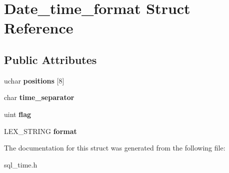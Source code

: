 \hypertarget{structDate__time__format}{}\section{Date\+\_\+time\+\_\+format Struct Reference}
\label{structDate__time__format}
\subsection*{Public Attributes}
\begin{DoxyCompactItemize}
\item 
\mbox{\label{structDate__time__format_a4a5f661901c001ffa183473fc2e618c1}} 
uchar {\bfseries positions} \mbox{[}8\mbox{]}
\item 
\mbox{\label{structDate__time__format_ad522046d6da80328315d6aa11ae57172}} 
char {\bfseries time\+\_\+separator}
\item 
\mbox{\label{structDate__time__format_a0068fcf48c7aa23358bbeeb66b321736}} 
uint {\bfseries flag}
\item 
\mbox{\label{structDate__time__format_ab288182618cca3fccc840e7ea1812756}} 
L\+E\+X\+\_\+\+S\+T\+R\+I\+NG {\bfseries format}
\end{DoxyCompactItemize}


The documentation for this struct was generated from the following file\+:\begin{DoxyCompactItemize}
\item 
sql\+\_\+time.\+h\end{DoxyCompactItemize}
